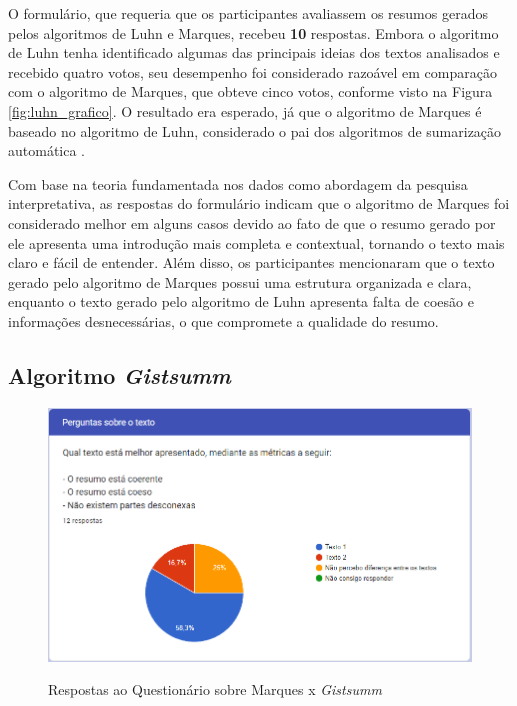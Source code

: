 O formulário, que requeria que os participantes avaliassem os resumos gerados pelos algoritmos de Luhn e Marques, recebeu \textbf{10} respostas. Embora o algoritmo de Luhn tenha identificado algumas das principais ideias dos textos analisados e recebido quatro votos, seu desempenho foi considerado razoável em comparação com o algoritmo de Marques, que obteve cinco votos, conforme visto na Figura \ref{fig:luhn_grafico}. O resultado era esperado, já que o algoritmo de Marques é baseado no algoritmo de Luhn, considerado o pai dos algoritmos de sumarização automática \cite{shashikanth2019text}.

Com base na teoria fundamentada nos dados \cite{cassiani1996teoria} como abordagem da pesquisa interpretativa, as respostas do formulário indicam que o algoritmo de Marques foi considerado melhor em alguns casos devido ao fato de que o resumo gerado por ele apresenta uma introdução mais completa e contextual, tornando o texto mais claro e fácil de entender. Além disso, os participantes mencionaram que o texto gerado pelo algoritmo de Marques possui uma estrutura organizada e clara, enquanto o texto gerado pelo algoritmo de Luhn apresenta falta de coesão e informações desnecessárias, o que compromete a qualidade do resumo.

\subsection{Algoritmo \textit{Gistsumm}}
\label{chap:gistsumm}

\begin{figure}[!h]
    \centering
    \caption{Respostas ao Questionário sobre Marques x \textit{Gistsumm}}
    \includegraphics[width=\textwidth]{figuras/graficos/gistsumm.png}
    \label{fig:gistsumm_grafico}
\end{figure}

